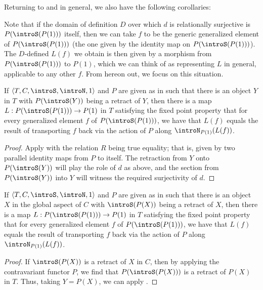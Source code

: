 Returning to  and  in general, we also have the following corollaries:

\begin{corollary}\label{RetractDiag}
Note that if the domain of definition $D$ over which $d$ is relationally surjective is $P(\introS(P(1)))$ itself, then we can take $f$ to be the generic generalized element of $P(\introS(P(1)))$ (the one given by the identity map on $P(\introS(P(1)))$). The $D$-defined $L(f)$ we obtain is then given by a morphism from $P(\introS(P(1)))$ to $P(1)$, which we can think of as representing $L$ in general, applicable to any other $f$. From hereon out, we focus on this situation.
\end{corollary}

\begin{corollary}\label{RetractInT}
If $\langle T, C, \introS, \introN, 1 \rangle$ and $P$ are given as in  such that there is an object $Y$ in $T$ with $P(\introS(Y))$ being a retract of $Y$, then there is a map $L : P(\introS(P(1))) \to P(1)$ in $T$ satisfying the fixed point property that for every generalized element $f$ of $P(\introS(P(1)))$, we have that $L(f)$ equals the result of transporting $f$ back via the action of $P$ along $\introN_{P(1)}(L(f))$.
\end{corollary}
\begin{proof}
Apply  with the relation $R$ being true equality; that is, given by two parallel identity maps from $P$ to itself. The retraction from $Y$ onto $P(\introS(Y))$ will play the role of $d$ as above, and the section from $P(\introS(Y))$ into $Y$ will witness the required surjectivity of $d$.
\end{proof}

\begin{corollary}\label{RetractInC}
If $\langle T, C, \introS, \introN, 1 \rangle$ and $P$ are given as in  such that there is an object $X$ in the global aspect of $C$ with $\introS(P(X))$ being a retract of $X$, then there is a map $L : P(\introS(P(1))) \to P(1)$ in $T$ satisfying the fixed point property that for every generalized element $f$ of $P(\introS(P(1)))$, we have that $L(f)$ equals the result of transporting $f$ back via the action of $P$ along $\introN_{P(1)}(L(f))$.
\end{corollary}
\begin{proof}
If $\introS(P(X))$ is a retract of $X$ in $C$, then by applying the contravariant functor $P$, we find that $P(\introS(P(X)))$ is a retract of $P(X)$ in $T$. Thus, taking $Y = P(X)$, we can apply .
\end{proof}

